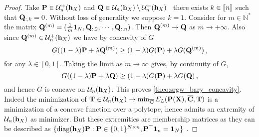 \begin{proof}
	
	Take ${\mathbf{P}} \in {\mathcal{U}}^{+}_n({\mathbf{h}}_X)$ and ${\mathbf{Q}} \in {\mathcal{U}}_n({\mathbf{h}}_X)\setminus{\mathcal{U}}^{+}_n({\mathbf{h}}_X)$ \ie\ there exists $k \in {[\![n]\!]}$ such that ${\mathbf{Q}}_{:,k} = 0$. Without loss of generality we suppose $k=1$. Consider for $m \in \mathbb{N}^{*}$ the matrix ${\mathbf{Q}}^{(m)} = (\frac{1}{m} \bm{1}_{N}, {\mathbf{Q}}_{:,2}, \cdots, {\mathbf{Q}}_{:,n})$. Then ${\mathbf{Q}}^{(m)} \to {\mathbf{Q}}$ as $m \to +\infty$. Also since ${\mathbf{Q}}^{(m)} \in {\mathcal{U}}^{+}_n({\mathbf{h}}_X)$ we have by concavity of $G$
	\begin{equation}
		G((1-\lambda) {\mathbf{P}} + \lambda {\mathbf{Q}}^{(m)}) \geq (1-\lambda) G({\mathbf{P}}) + \lambda G({\mathbf{Q}}^{(m)})\,,
	\end{equation}
	for any $\lambda \in [0,1]$. Taking the limit as $m \to \infty$ gives, by continuity of $G$,
	\begin{equation}
		G((1-\lambda) {\mathbf{P}} + \lambda {\mathbf{Q}}) \geq (1-\lambda) G({\mathbf{P}}) + \lambda G({\mathbf{Q}})\,,
	\end{equation}
	and hence $G$ is concave on ${\mathcal{U}}_n({\mathbf{h}}_X)$. This proves \cref{theo:srgw_bary_concavity}. Indeed the minimization of ${\mathbf{T}} \in {\mathcal{U}}_n({\mathbf{h}}_X) \to \min_{\overline{{\mathbf{C}}}} E_{L}({\mathbf{P}}({\mathbf{X}}), \overline{{\mathbf{C}}}, {\mathbf{T}})$ is a minimization of a concave function over a polytope, hence admits an extremity of ${\mathcal{U}}_n({\mathbf{h}}_X)$ as minimizer. But these extremities are membership matrices as they can be described as $\{\operatorname{diag}({\mathbf{h}}_X) {\mathbf{P}}: {\mathbf{P}} \in \{0,1\}^{N \times n}, {\mathbf{P}}^\top \bm{1}_n = \bm{1}_N\}$ \citep{cao2022centrosymmetric}.
\end{proof}






